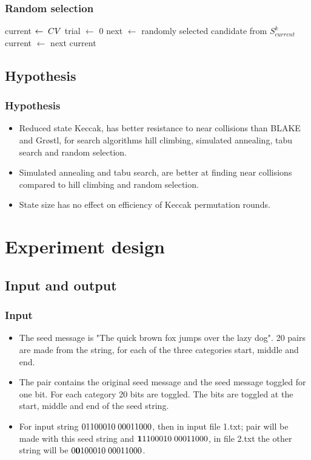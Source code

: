 \documentclass{beamer}
\begin{document}
\begin{frame}[allowframebreaks]
\frametitle{Random selection}
  \begin{algorithmic}[1]
      \State current $\gets \thickspace CV$
      \State trial $\gets$ 0
        \State next $\gets$ randomly selected candidate from $S^{k}_{current}$
          \State current $\gets$ next
        \EndIf
      \EndWhile 
      \State \Return current
    \EndFunction
  \end{algorithmic}
\end{frame}

\subsection{Hypothesis}

\begin{frame}
\frametitle{Hypothesis}
\begin{itemize}
\item Reduced state Keccak, has better resistance to near collisions than BLAKE and Gr{\o}stl, for
search algorithms hill climbing, simulated annealing, tabu search and random selection.
\item Simulated annealing and tabu search, are better at finding near collisions compared to hill 
climbing and random selection.
\item State size has no effect on efficiency of Keccak permutation rounds.    
\end{itemize}
\end{frame}

\section{Experiment design}

\subsection{Input and output}

\begin{frame}
\frametitle{Input}
\begin{itemize}
\item The seed message is "The quick brown fox jumps over the lazy dog". 20 pairs are made from the
string, for each of the three categories start, middle and end.
\item The pair contains the original seed message and the seed message toggled for one bit. For each
category 20 bits are toggled. The bits are toggled at the start, middle and end of the seed string.
\item For input string $01100010\thickspace00011000$, then in input file 1.txt; pair will be made with this seed
string and ${\bf 1}1100010\thickspace00011000$, in file 2.txt the other  string will be 
$0{\bf 0}100010\thickspace00011000$.
\end{itemize}
\end{frame}
\end{document}

